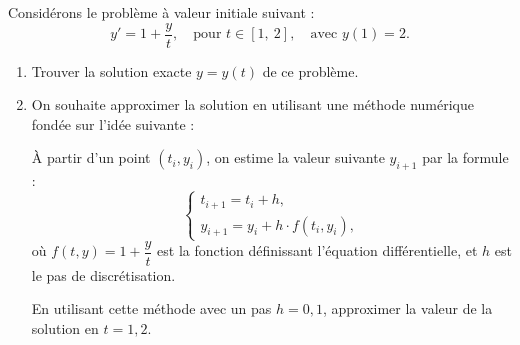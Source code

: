 
Considérons le problème à valeur initiale suivant :
\[
y' = 1 + \frac{y}{t}, \quad \text{pour } t \in [1,\ 2], \quad \text{avec } y(1) = 2.
\]

\begin{enumerate}
    \item Trouver la solution exacte $y = y(t)$ de ce problème.
    
    \item On souhaite approximer la solution en utilisant une méthode numérique fondée sur l'idée suivante :
    
    \medskip
    
    À partir d'un point $(t_i, y_i)$, on estime la valeur suivante $y_{i+1}$ par la formule :
    \[
    \begin{cases}
    t_{i+1} = t_i + h, \\
    y_{i+1} = y_i + h \cdot f(t_i, y_i),
    \end{cases}
    \]
    où $f(t, y) = 1 + \dfrac{y}{t}$ est la fonction définissant l'équation différentielle, et $h$ est le pas de discrétisation.
    
    \medskip
    
    En utilisant cette méthode avec un pas $h = 0{,}1$, approximer la valeur de la solution en $t = 1{,}2$.
\end{enumerate}